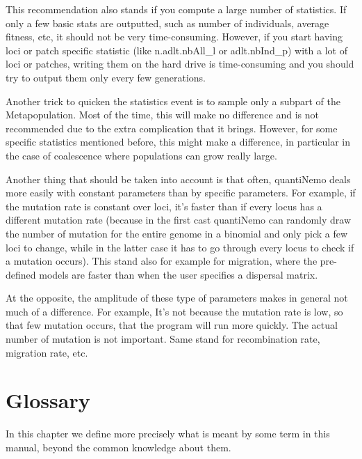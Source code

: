 \documentclass[letterpaper,12pt,oneside]{book}
\begin{document}
\begin{appendices}
This recommendation also stands if you compute a large number of statistics. If only a few basic stats are outputted, such as number of individuals, average fitness, etc, it should not be very time-consuming. However, if you start having loci or patch specific statistic (like n.adlt.nbAll\_l or adlt.nbInd\_p) with a lot of loci or patches, writing them on the hard drive is time-consuming and you should try to output them only every few generations. 

Another trick to quicken the statistics event is to sample only a subpart of the Metapopulation. Most of the time, this will make no difference and is not recommended due to the extra complication that it brings. However, for some specific statistics mentioned before, this might make a difference, in particular in the case of coalescence where populations can grow really large. 

Another thing that should be taken into account is that often, quantiNemo deals more easily with constant parameters than by specific parameters. For example, if the mutation rate is constant over loci, it's faster than if every locus has a different mutation rate (because in the first cast quantiNemo can randomly draw the number of mutation for the entire genome in a binomial and only pick a few loci to change, while in the latter case it has to go through every locus to check if a mutation occurs). This stand also for example for migration, where the pre-defined models are faster than when the user specifies a dispersal matrix. 

At the opposite, the amplitude of these type of parameters makes in general not much of a difference. For example, It's not because the mutation rate is low, so that few mutation occurs, that the program will run more quickly. The actual number of mutation is not important. Same stand for recombination rate, migration rate, etc. 

\chapter{Glossary}\label{chap:Glossary}
In this chapter we define more precisely what is meant by some term in this manual, beyond the common knowledge about them. 


\end{appendices}
\end{document}
